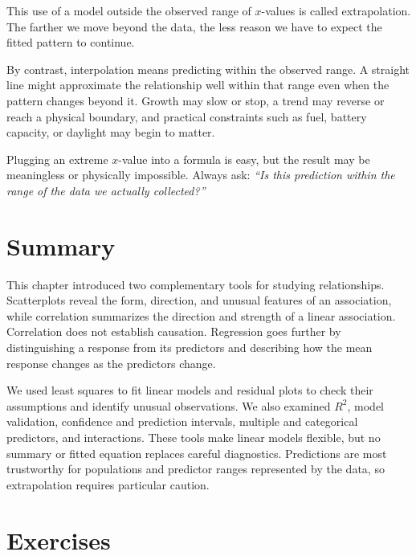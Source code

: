 This use of a model outside the observed range of $x$-values is called
extrapolation. The farther we move beyond the data, the
less reason we have to expect the fitted pattern to continue.

By contrast, interpolation means predicting within the
observed range. A straight line might approximate the relationship well within
that range even when the pattern changes beyond it. Growth may slow or stop, a
trend may reverse or reach a physical boundary, and practical constraints such
as fuel, battery capacity, or daylight may begin to matter.

Plugging an extreme $x$-value into a formula is easy, but the result may be
meaningless or physically impossible. Always ask: \emph{``Is this prediction
within the range of the data we actually collected?''}

\section{Summary}

This chapter introduced two complementary tools for studying relationships.
Scatterplots reveal the form, direction, and unusual features of an
association, while correlation summarizes the direction and strength of a
linear association. Correlation does not establish causation. Regression goes
further by distinguishing a response from its predictors and describing how
the mean response changes as the predictors change.

We used least squares to fit linear models and residual plots to check their
assumptions and identify unusual observations. We also examined $R^2$, model
validation, confidence and prediction intervals, multiple and categorical
predictors, and interactions. These tools make linear models flexible, but no
summary or fitted equation replaces careful diagnostics. Predictions are most
trustworthy for populations and predictor ranges represented by the data, so
extrapolation requires particular caution.

\section{Exercises}

